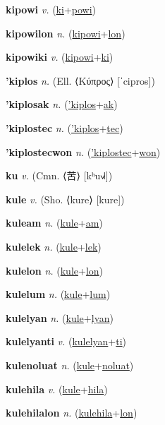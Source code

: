 \textbf{\hypertarget{kipowi}{kipowi}} \textit{v.} (\hyperlink{ki}{ki}+\allowbreak \hyperlink{powi}{powi})


\textbf{\hypertarget{kipowilon}{kipowilon}} \textit{n.} (\hyperlink{kipowi}{kipowi}+\allowbreak \hyperlink{lon}{lon})


\textbf{\hypertarget{kipowiki}{kipowiki}} \textit{v.} (\hyperlink{kipowi}{kipowi}+\allowbreak \hyperlink{ki}{ki})


\textbf{\hypertarget{'kiplos}{'kiplos}} \textit{n.} (Ell. ⟨Κύπρος⟩ [ˈcipros])


\textbf{\hypertarget{'kiplosak}{'kiplosak}} \textit{n.} (\hyperlink{'kiplos}{'kiplos}+\allowbreak \hyperlink{ak}{ak})


\textbf{\hypertarget{'kiplostec}{'kiplostec}} \textit{n.} (\hyperlink{'kiplos}{'kiplos}+\allowbreak \hyperlink{tec}{tec})


\textbf{\hypertarget{'kiplostecwon}{'kiplostecwon}} \textit{n.} (\hyperlink{'kiplostec}{'kiplostec}+\allowbreak \hyperlink{won}{won})


\textbf{\hypertarget{ku}{ku}} \textit{v.} (Cmn. ⟨{\chinese{}苦}⟩ [kʰu˧˩˧])


\textbf{\hypertarget{kule}{kule}} \textit{v.} (Sho. ⟨kure⟩ [kure])


\textbf{\hypertarget{kuleam}{kuleam}} \textit{n.} (\hyperlink{kule}{kule}+\allowbreak \hyperlink{am}{am})


\textbf{\hypertarget{kulelek}{kulelek}} \textit{n.} (\hyperlink{kule}{kule}+\allowbreak \hyperlink{lek}{lek})


\textbf{\hypertarget{kulelon}{kulelon}} \textit{n.} (\hyperlink{kule}{kule}+\allowbreak \hyperlink{lon}{lon})


\textbf{\hypertarget{kulelum}{kulelum}} \textit{n.} (\hyperlink{kule}{kule}+\allowbreak \hyperlink{lum}{lum})


\textbf{\hypertarget{kulelyan}{kulelyan}} \textit{n.} (\hyperlink{kule}{kule}+\allowbreak \hyperlink{lyan}{lyan})


\textbf{\hypertarget{kulelyanti}{kulelyanti}} \textit{v.} (\hyperlink{kulelyan}{kulelyan}+\allowbreak \hyperlink{ti}{ti})


\textbf{\hypertarget{kulenoluat}{kulenoluat}} \textit{n.} (\hyperlink{kule}{kule}+\allowbreak \hyperlink{noluat}{noluat})


\textbf{\hypertarget{kulehila}{kulehila}} \textit{v.} (\hyperlink{kule}{kule}+\allowbreak \hyperlink{hila}{hila})


\textbf{\hypertarget{kulehilalon}{kulehilalon}} \textit{n.} (\hyperlink{kulehila}{kulehila}+\allowbreak \hyperlink{lon}{lon})


